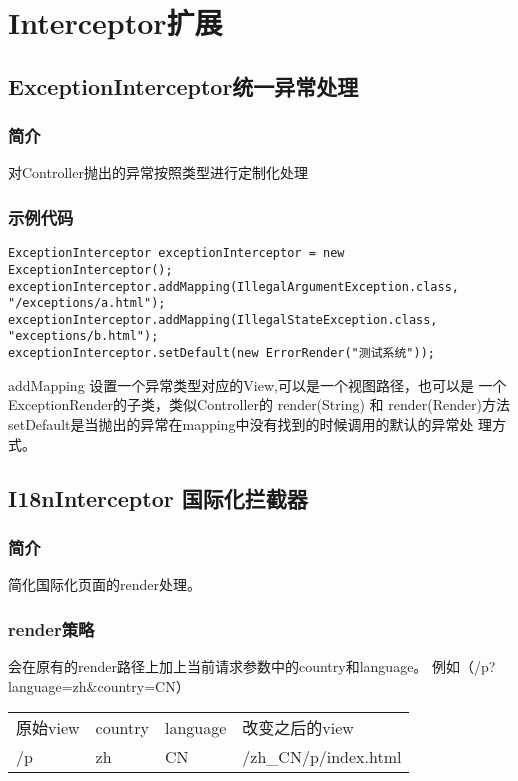 \documentclass{scrartcl}
\begin{document}
  
\section{Interceptor扩展}
\label{sec-5}
\subsection{ExceptionInterceptor统一异常处理}
\label{sec-5-1}
\subsubsection{简介}
\label{sec-5-1-1}

    对Controller抛出的异常按照类型进行定制化处理
\subsubsection{示例代码}
\label{sec-5-1-2}


\begin{verbatim}
ExceptionInterceptor exceptionInterceptor = new ExceptionInterceptor();
exceptionInterceptor.addMapping(IllegalArgumentException.class, "/exceptions/a.html");
exceptionInterceptor.addMapping(IllegalStateException.class, "exceptions/b.html");
exceptionInterceptor.setDefault(new ErrorRender("测试系统"));
\end{verbatim}
   addMapping 设置一个异常类型对应的View,可以是一个视图路径，也可以是
   一个ExceptionRender的子类，类似Controller的 render(String) 和
   render(Render)方法
   setDefault是当抛出的异常在mapping中没有找到的时候调用的默认的异常处
   理方式。
\subsection{I18nInterceptor 国际化拦截器}
\label{sec-5-2}
\subsubsection{简介}
\label{sec-5-2-1}

    简化国际化页面的render处理。
\subsubsection{render策略}
\label{sec-5-2-2}

   会在原有的render路径上加上当前请求参数中的country和language。
   例如（/p?language=zh\&country=CN）

\begin{tabular}{llll}
 原始view  &  country  &  language  &  改变之后的view       \\
 /p        &  zh       &  CN        &  /zh_CN/p/index.html  \\
\end{tabular}
\end{document}
